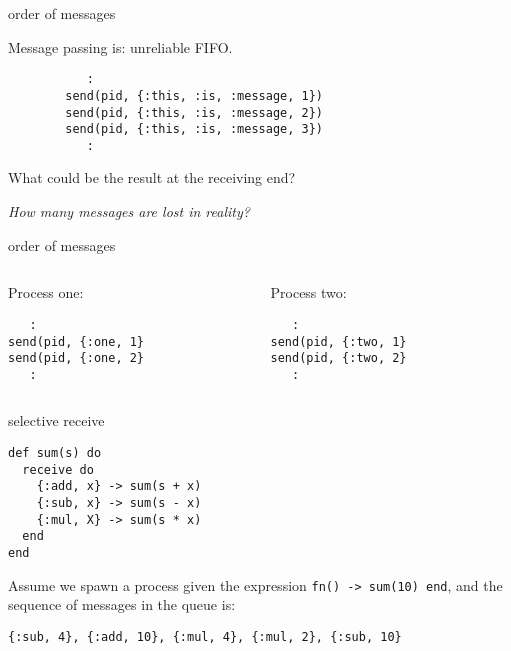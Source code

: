 \begin{frame}[fragile]{order of messages}

Message passing is: unreliable FIFO.

\pause\vspace{10pt}
\begin{verbatim}
           :
        send(pid, {:this, :is, :message, 1})
        send(pid, {:this, :is, :message, 2})
        send(pid, {:this, :is, :message, 3})
           :
\end{verbatim}

\pause What could be the result at the receiving end?

\pause\vspace{10pt}
{\em How many messages are lost in reality?} 

\end{frame}

\begin{frame}[fragile]{order of messages}

  \begin{columns}
    \begin{column}{0.5\textwidth}
Process one:
\begin{verbatim}
   :
send(pid, {:one, 1}
send(pid, {:one, 2}
   :
\end{verbatim}
    \end{column}
    \begin{column}{0.5\textwidth}
Process two:
\begin{verbatim}
   :
send(pid, {:two, 1}
send(pid, {:two, 2}
   :
\end{verbatim}
    \end{column}
    
  \end{columns}
  
\end{frame}

\begin{frame}[fragile]{selective receive}

\begin{verbatim}
def sum(s) do
  receive do
    {:add, x} -> sum(s + x)
    {:sub, x} -> sum(s - x)
    {:mul, X} -> sum(s * x)
  end
end
\end{verbatim}

\pause\vspace{10pt}

Assume we spawn a process given the expression {\tt fn() -> sum(10) end}, \pause and the sequence of messages in the queue is:

\vspace{10pt}
{\tt \{:sub, 4\}, \{:add, 10\}, \{:mul, 4\}, \{:mul, 2\}, \{:sub, 10\}}

\end{frame}



